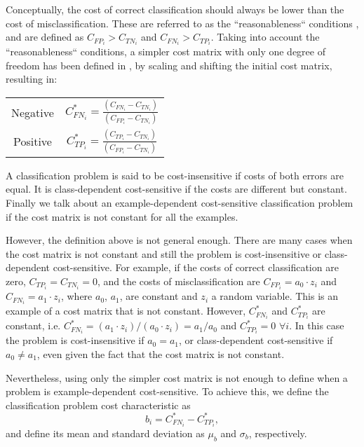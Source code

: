   Conceptually, the cost of correct classification should always be lower than the cost of 
misclassification.
  These are referred to as the ``reasonableness`` conditions \citep{Elkan2001}, and are defined as
  $C_{FP_i} > C_{TN_i}$ and $C_{FN_i} > C_{TP_i}$.
  Taking into account the ``reasonableness`` conditions, a simpler cost matrix 
  with only one degree of freedom has been defined in \citep{Elkan2001},
  by scaling and shifting the initial cost matrix, resulting in:
  \begin{center}
  \begin{tabular}{c|c}

  \multirow{ 2}{*}{Negative} & \multirow{ 
2}{*}{$C^*_{FN_i}=\frac{(C_{FN_i}-C_{TN_i})}{(C_{FP_i}-C_{TN_i})}$} \\
  \\
  \hline
  \multirow{ 2}{*}{Positive} & \multirow{ 
2}{*}{$C^*_{TP_i}=\frac{(C_{TP_i}-C_{TN_i})}{(C_{FP_i}-C_{TN_i})}$} \\
  \\ 
  \end{tabular}
\end{center}

  A classification problem is said to be cost-insensitive if costs of both errors are equal. It 
		is class-dependent cost-sensitive if the costs are different but constant. Finally we talk 
		about an example-dependent cost-sensitive classification problem if the cost matrix is not 
		constant for all the examples.
  
	  However, the definition above is not general enough. There are many cases when the cost matrix 
		is not constant and still the problem is cost-insensitive or class-dependent cost-sensitive. 
	  For example, if the costs of correct classification are zero, \mbox{$C_{TP_i}=C_{TN_i}=0$}, 
	  and the costs of misclassification are $C_{FP_i}=a_0\cdot z_i$ and $C_{FN_i}=a_1\cdot z_i$,
	  where $a_0$, $a_1$, are constant and $z_i$ a random variable. This is an example of a cost 
		matrix that is not constant. However, $C^*_{FN_i}$ and $C^*_{TP_i}$ are constant, i.e. 
		$C^*_{FN_i}=(a_1\cdot z_i)/(a_0\cdot z_i)=a_1/a_0$ and $C^*_{TP_i}=0$ $\forall i$. In 
		this case the problem is cost-insensitive if $a_0=a_1$, or class-dependent cost-sensitive if 
		$a_0 \ne a_1$, even given the fact that the cost matrix is not constant.
  
	  Nevertheless, using only the simpler cost matrix is not enough to define when a problem is 
		example-dependent cost-sensitive. To achieve this, we define the classification problem cost 
		characteristic as 
	  \begin{equation}
	   b_i = C^*_{FN_i}-C^*_{TP_i},
	  \end{equation}
	  and define its mean and standard deviation as $\mu_b$ and $\sigma_b$, respectively.
  
